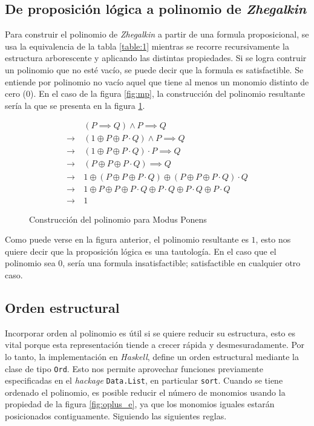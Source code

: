 \subsection{De proposición lógica a polinomio de \textit{Zhegalkin}}

Para construir el polinomio de \textit{Zhegalkin} a partir de una formula proposicional, se usa la equivalencia de la tabla \ref{table:1} mientras se recorre recursivamente la estructura arborescente y aplicando las distintas propiedades. Si se logra contruir un polinomio que no esté vacío, se puede decir que la formula es satisfactible. Se entiende por polinomio no vacío aquel que tiene al menos un monomio distinto de cero ($0$). En el caso de la figura \ref{fig:mp}, la construcción del polinomio resultante sería la que se presenta en la figura \ref{fig:mp_anf}.

\begin{figure}[!ht]
\begin{align*}
                 & (P\implies Q)\land P \implies Q\\
    \rightarrow\ & (1 \oplus P \oplus P\cdot Q)\land P \implies Q\\
    \rightarrow\ & (1 \oplus P \oplus P\cdot Q)\cdot P \implies Q\\
    \rightarrow\ & (P \oplus P \oplus P\cdot Q) \implies Q\\
    \rightarrow\ & 1 \oplus (P \oplus P \oplus P\cdot Q) \oplus (P \oplus P \oplus P\cdot Q)\cdot Q\\
    \rightarrow\ & 1 \oplus P \oplus P \oplus P\cdot Q \oplus P\cdot Q\oplus P\cdot Q \oplus P\cdot Q \\
    \rightarrow\ & 1
\end{align*}
\caption{Construcción del polinomio para Modus Ponens}
\label{fig:mp_anf}
\end{figure}

Como puede verse en la figura anterior, el polinomio resultante es $1$, esto nos quiere decir que la proposición lógica es una tautología. En el caso que el polinomio sea $0$, sería una formula insatisfactible; satisfactible en cualquier otro caso.

\subsection{Orden estructural}

Incorporar orden al polinomio es útil si se quiere reducir su estructura, esto es vital porque esta representación tiende a crecer rápida y desmesuradamente. Por lo tanto, la implementación en \textit{Haskell}, define un orden estructural mediante la clase de tipo \texttt{Ord}. Esto nos permite aprovechar funciones previamente especificadas en el \textit{hackage} \texttt{Data.List}, en particular \texttt{sort}. Cuando se tiene ordenado el polinomio, es posible reducir el número de monomios usando la propiedad de la figura \ref{fig:oplus_e}, ya que los monomios iguales estarán posicionados contiguamente. Siguiendo las siguientes reglas.

